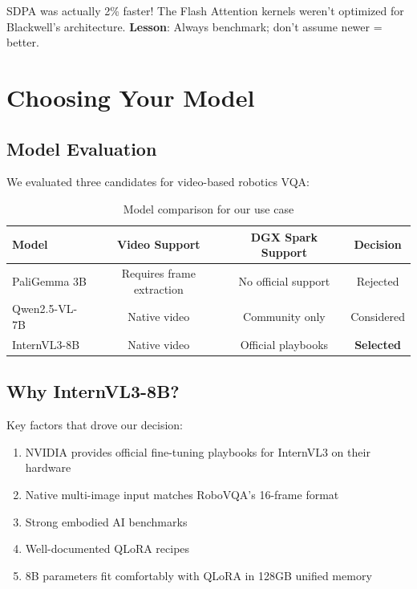 \documentclass[11pt,a4paper]{article}
\begin{document}
SDPA was actually 2\% faster! The Flash Attention kernels weren't optimized for Blackwell's architecture. \textbf{Lesson}: Always benchmark; don't assume newer = better.

\section{Choosing Your Model}

\subsection{Model Evaluation}

We evaluated three candidates for video-based robotics VQA:

\begin{table}[H]
\centering
\begin{tabular}{@{}lccc@{}}
\toprule
\textbf{Model} & \textbf{Video Support} & \textbf{DGX Spark Support} & \textbf{Decision} \\
\midrule
PaliGemma 3B & Requires frame extraction & No official support & Rejected \\
Qwen2.5-VL-7B & Native video & Community only & Considered \\
InternVL3-8B & Native video & Official playbooks & \textbf{Selected} \\
\bottomrule
\end{tabular}
\caption{Model comparison for our use case}
\end{table}

\subsection{Why InternVL3-8B?}

Key factors that drove our decision:
\begin{enumerate}
    \item NVIDIA provides official fine-tuning playbooks for InternVL3 on their hardware
    \item Native multi-image input matches RoboVQA's 16-frame format
    \item Strong embodied AI benchmarks
    \item Well-documented QLoRA recipes
    \item 8B parameters fit comfortably with QLoRA in 128GB unified memory
\end{enumerate}
\end{document}
